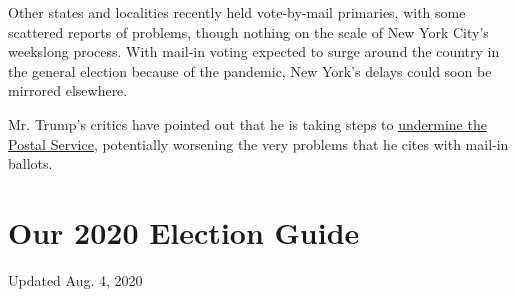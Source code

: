 Other states and localities recently held vote-by-mail primaries, with
some scattered reports of problems, though nothing on the scale of New
York City's weekslong process. With mail-in voting expected to surge
around the country in the general election because of the pandemic, New
York's delays could soon be mirrored elsewhere.

Mr. Trump's critics have pointed out that he is taking steps to
\href{https://www.nytimes3xbfgragh.onion/2020/07/31/us/politics/trump-usps-mail-delays.html}{undermine
the Postal Service}, potentially worsening the very problems that he
cites with mail-in ballots.

\hypertarget{our-2020-election-guide}{%
\section{Our 2020 Election Guide}\label{our-2020-election-guide}}

Updated Aug. 4, 2020


